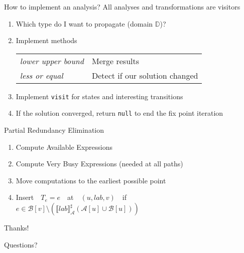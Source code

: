 \documentclass[xcolor={usenames,dvipsnames}, aspectratio=169, 12pt]{beamer}
\begin{document}
\begin{frame}[fragile]{How to implement an analysis?}
All analyses and transformations are visitors
\begin{enumerate}
\item Which type do I want to propagate (domain $\mathbb{D}$)?
\item Implement methods\\
\begin{tabular}{ll}
	\emph{lower upper bound} & Merge results\\
	\emph{less or equal} & Detect if our solution changed\\
\end{tabular}
\item Implement \texttt{visit} for states and interesting transitions
\item If the solution converged, return \texttt{null} to end the fix point iteration
\end{enumerate}
\end{frame}

\begin{frame}{Partial Redundancy Elimination}
	\begin{enumerate}
		\item Compute Available Expressions
		\item Compute Very Busy Expressions (needed at all paths)
		\item Move computations to the earliest possible point
		\item<2-> Insert\ \ $T_e = e$\ \ at\ \ $(u, lab, v)$\ \ if\\
			$e \in \mathcal{B}[v]\setminus(\llbracket lab\rrbracket^{\sharp}_{\mathcal{A}}(\mathcal{A}[u] \cup \mathcal{B}[u]))$
	\end{enumerate}
\end{frame}

\begin{tumplainframe}{Thanks!}
\begin{center}
	\Huge Questions?
\end{center}
\end{tumplainframe}
\end{document}
